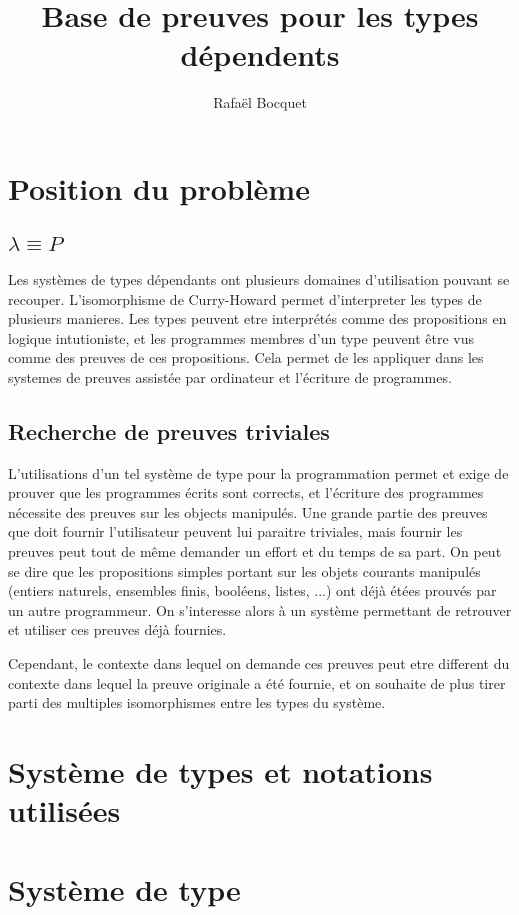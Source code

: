 \documentclass[12pt, a4paper]{article}
\title{Base de preuves pour les types dépendents}
\author{Rafaël Bocquet}
\date{}
\begin{document}
\maketitle
\tableofcontents

\newpage


\section{Position du problème}
\subsection{$\lambda \equiv P$}
Les systèmes de types dépendants ont plusieurs domaines d'utilisation pouvant se recouper. L'isomorphisme de Curry-Howard permet d'interpreter les types de plusieurs manieres. Les types peuvent etre interprétés comme des propositions en logique intutioniste, et les programmes membres d'un type peuvent être vus comme des preuves de ces propositions. Cela permet de les appliquer dans les systemes de preuves assistée par ordinateur et l'écriture de programmes.
\subsection{Recherche de preuves triviales}
L'utilisations d'un tel système de type pour la programmation permet et exige de prouver que les programmes écrits sont corrects, et l'écriture des programmes nécessite des preuves sur les objects manipulés. Une grande partie des preuves que doit fournir l'utilisateur peuvent lui paraitre triviales, mais fournir les preuves peut tout de même demander un effort et du temps de sa part. On peut se dire que les propositions simples portant sur les objets courants manipulés (entiers naturels, ensembles finis, booléens, listes, ...) ont déjà étées prouvés par un autre programmeur. On s'interesse alors à un système permettant de retrouver et utiliser ces preuves déjà fournies.

Cependant, le contexte dans lequel on demande ces preuves peut etre different du contexte dans lequel la preuve originale a été fournie, et on souhaite de plus tirer parti des multiples isomorphismes entre les types du système.
\section{Système de types et notations utilisées}



\section{Système de type}
\end{document}
